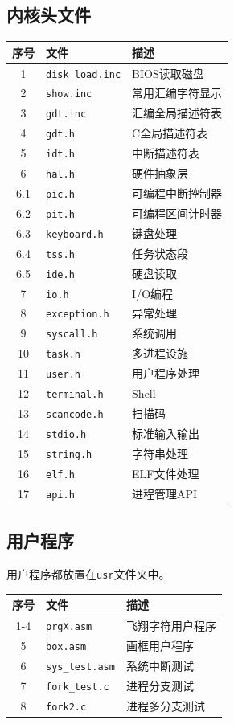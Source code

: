 \documentclass[logo,reportComp]{thesis}
\begin{document}
\subsection{内核头文件}
\begin{center}
\begin{tabular}{|c|l|l|}\hline
\textbf{序号} & \textbf{文件} & \textbf{描述} \\\hline
1 & \verb'disk_load.inc' & BIOS读取磁盘\\\hline
2 & \verb'show.inc' & 常用汇编字符显示\\\hline
3 & \verb'gdt.inc' & 汇编全局描述符表\\\hline
4 & \verb'gdt.h' & C全局描述符表\\\hline
5 & \verb'idt.h' & 中断描述符表\\\hline
6 & \verb'hal.h' & 硬件抽象层\\\hline
6.1 & \verb'pic.h' & 可编程中断控制器\\\hline
6.2 & \verb'pit.h' & 可编程区间计时器\\\hline
6.3 & \verb'keyboard.h' & 键盘处理\\\hline
6.4 & \verb'tss.h' & 任务状态段\\\hline
6.5 & \verb'ide.h' & 硬盘读取\\\hline
7 & \verb'io.h' & I/O编程\\\hline
8 & \verb'exception.h' & 异常处理\\\hline
9 & \verb'syscall.h' & 系统调用\\\hline
10 & \verb'task.h' & 多进程设施\\\hline
11 & \verb'user.h' & 用户程序处理\\\hline
12 & \verb'terminal.h' & Shell\\\hline
13 & \verb'scancode.h' & 扫描码\\\hline
14 & \verb'stdio.h' & 标准输入输出\\\hline
15 & \verb'string.h' & 字符串处理\\\hline
16 & \verb'elf.h' & ELF文件处理\\\hline
17 & \verb'api.h' & 进程管理API\\\hline
\end{tabular}
\end{center}

\subsection{用户程序}
用户程序都放置在\verb'usr'文件夹中。
\begin{center}
\begin{tabular}{|c|l|l|}\hline
\textbf{序号} & \textbf{文件} & \textbf{描述} \\\hline
1-4 & \verb'prgX.asm' & 飞翔字符用户程序\\\hline
5 & \verb'box.asm' & 画框用户程序\\\hline
6 & \verb'sys_test.asm' & 系统中断测试\\\hline
7 & \verb'fork_test.c' & 进程分支测试\\\hline
8 & \verb'fork2.c' & 进程多分支测试\\\hline
\end{tabular}
\end{center}
\end{document}
